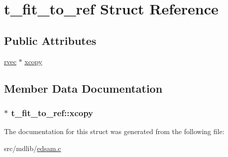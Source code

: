 \hypertarget{structt__fit__to__ref}{\section{t\-\_\-fit\-\_\-to\-\_\-ref \-Struct \-Reference}
\label{structt__fit__to__ref}
}
\subsection*{\-Public \-Attributes}
\begin{DoxyCompactItemize}
\item 
\hyperlink{share_2template_2gromacs_2types_2simple_8h_aa02a552a4abd2f180c282a083dc3a999}{rvec} $\ast$ \hyperlink{structt__fit__to__ref_aa2e0c3b48253dff1bb8217f4e11f1beb}{xcopy}
\end{DoxyCompactItemize}


\subsection{\-Member \-Data \-Documentation}
\hypertarget{structt__fit__to__ref_aa2e0c3b48253dff1bb8217f4e11f1beb}{
\subsubsection[{xcopy}]{$\ast$ {\bf t\-\_\-fit\-\_\-to\-\_\-ref\-::xcopy}}}\label{structt__fit__to__ref_aa2e0c3b48253dff1bb8217f4e11f1beb}


\-The documentation for this struct was generated from the following file\-:\begin{DoxyCompactItemize}
\item 
src/mdlib/\hyperlink{edsam_8c}{edsam.\-c}\end{DoxyCompactItemize}

